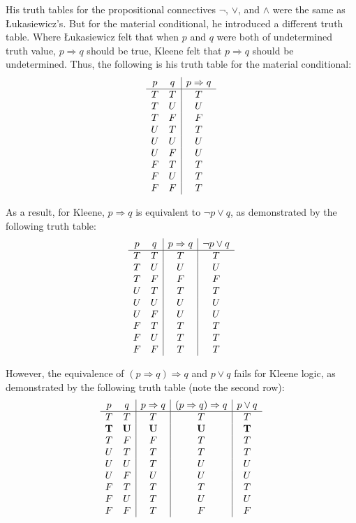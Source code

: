 \documentclass[11pt]{article}
\theoremstyle{definition}
\theoremstyle{remark}
\begin{document}
His truth tables for the propositional connectives $\neg$, $\vee$, and $\wedge$ were the same as  Łukasiewicz's. But for the material conditional, he introduced a different truth table. Where  Łukasiewicz felt that when $p$ and $q$ were both of undetermined truth value, $p\Rightarrow q$ should be true, Kleene felt that $p\Rightarrow q$ should be undetermined. Thus, the following is his truth table for the material conditional:
\[
\begin{array}{c c|c}
p & q & p \Rightarrow q \\
\hline
T & T & T \\
T & U & U \\
T & F & F \\
U & T & T \\
U & U & U \\
U & F & U \\
F & T & T \\
F & U & T \\
F & F & T \\
\end{array}
\]\par
\noindent
As a result, for Kleene, $p\Rightarrow q$ is equivalent to $\neg p\vee q$, as demonstrated by the following truth table:
\noindent
\[
\begin{array}{c c|c|c}
p & q & p \Rightarrow q & \neg p \vee q \\
\hline
T & T & T & T\\
T & U & U & U \\
T & F & F & F\\
U & T & T & T\\
U & U & U & U\\
U & F & U & U\\
F & T & T & T\\
F & U & T & T\\
F & F & T & T \\
\end{array}
\]\par
\noindent
However, the equivalence of $(p\Rightarrow q)\Rightarrow q$ and $p\vee q$ fails for Kleene logic, as demonstrated by the following truth table (note the second row):
\noindent
\[
\begin{array}{c c|c|c|c}
p & q & p \Rightarrow q & (p \Rightarrow q) \Rightarrow q & p \lor q \\
\hline
T & T & T & T & T \\
\textbf{T} & \textbf{U} & \textbf{U} & \textbf{U} & \textbf{T} \\
T & F & F & T & T \\
U & T & T & T & T \\
U & U & T & U & U \\
U & F & U & U & U \\
F & T & T & T & T \\
F & U & T & U & U \\
F & F & T & F & F \\
\end{array}
\]\par
\end{document}
